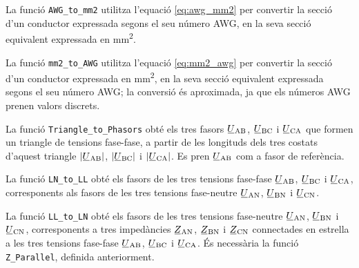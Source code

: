 


La funció \texttt{AWG\_to\_mm2} utilitza l'equació \eqref{eq:awg_mm2} per convertir la secció d'un conductor expressada segons el seu número AWG, en la seva secció equivalent expressada en \unit{mm^2}.




La funció \texttt{mm2\_to\_AWG} utilitza l'equació \eqref{eq:mm2_awg} per convertir la secció d'un conductor expressada en \unit{mm^2}, en la seva secció equivalent expressada segons el seu número AWG; la conversió és aproximada, ja que els números AWG prenen valors discrets.




La funció \texttt{Triangle\_to\_Phasors} obté els tres fasors $\cmplx{U}\ped{AB}$, $\cmplx{U}\ped{BC}$ i $\cmplx{U}\ped{CA}$ que formen un triangle de tensions fase-fase, a partir de les longituds dels tres costats d'aquest triangle $|\cmplx{U}\ped{AB}|$, $|\cmplx{U}\ped{BC}|$ i $|\cmplx{U}\ped{CA}|$. Es pren $\cmplx{U}\ped{AB}$ com a fasor de referència.




La funció \texttt{LN\_to\_LL} obté els fasors de les tres tensions fase-fase $\cmplx{U}\ped{AB}$, $\cmplx{U}\ped{BC}$ i $\cmplx{U}\ped{CA}$, corresponents als fasors de les tres tensions fase-neutre
$\cmplx{U}\ped{AN}$, $\cmplx{U}\ped{BN}$ i $\cmplx{U}\ped{CN}$.




La funció \texttt{LL\_to\_LN} obté els fasors de les tres tensions fase-neutre $\cmplx{U}\ped{AN}$, $\cmplx{U}\ped{BN}$ i $\cmplx{U}\ped{CN}$, corresponents a tres impedàncies $\cmplx{Z}\ped{AN}$, $\cmplx{Z}\ped{BN}$ i $\cmplx{Z}\ped{CN}$ connectades en estrella a  les tres tensions fase-fase
$\cmplx{U}\ped{AB}$, $\cmplx{U}\ped{BC}$ i $\cmplx{U}\ped{CA}$. És necessària la funció \texttt{Z\_Parallel}, definida anteriorment.

